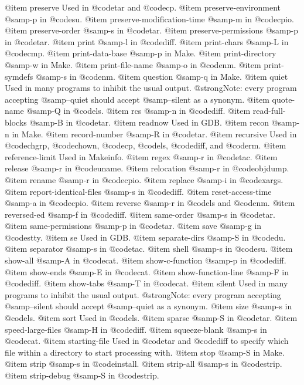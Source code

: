 @item preserve
Used in @code{tar} and @code{cp}.
@item preserve-environment
@samp{-p} in @code{su}.
@item preserve-modification-time
@samp{-m} in @code{cpio}.
@item preserve-order
@samp{-s} in @code{tar}.
@item preserve-permissions
@samp{-p} in @code{tar}.
@item print
@samp{-l} in @code{diff}.
@item print-chars
@samp{-L} in @code{cmp}.
@item print-data-base
@samp{-p} in Make.
@item print-directory
@samp{-w} in Make.
@item print-file-name
@samp{-o} in @code{nm}.
@item print-symdefs
@samp{-s} in @code{nm}.
@item question
@samp{-q} in Make.
@item quiet
Used in many programs to inhibit the usual output.  @strong{Note:} every
program accepting @samp{--quiet} should accept @samp{--silent} as a
synonym.
@item quote-name
@samp{-Q} in @code{ls}.
@item rcs
@samp{-n} in @code{diff}.
@item read-full-blocks
@samp{-B} in @code{tar}.
@item readnow
Used in GDB.
@item recon
@samp{-n} in Make.
@item record-number
@samp{-R} in @code{tar}.
@item recursive
Used in @code{chgrp}, @code{chown}, @code{cp}, @code{ls}, @code{diff},
and @code{rm}.
@item reference-limit
Used in Makeinfo.
@item regex
@samp{-r} in @code{tac}.
@item release
@samp{-r} in @code{uname}.
@item relocation
@samp{-r} in @code{objdump}.
@item rename
@samp{-r} in @code{cpio}.
@item replace
@samp{-i} in @code{xargs}.
@item report-identical-files
@samp{-s} in @code{diff}.
@item reset-access-time
@samp{-a} in @code{cpio}.
@item reverse
@samp{-r} in @code{ls} and @code{nm}.
@item reversed-ed
@samp{-f} in @code{diff}.
@item same-order
@samp{-s} in @code{tar}.
@item same-permissions
@samp{-p} in @code{tar}.
@item save
@samp{-g} in @code{stty}.
@item se
Used in GDB.
@item separate-dirs
@samp{-S} in @code{du}.
@item separator
@samp{-s} in @code{tac}.
@item shell
@samp{-s} in @code{su}.
@item show-all
@samp{-A} in @code{cat}.
@item show-c-function
@samp{-p} in @code{diff}.
@item show-ends
@samp{-E} in @code{cat}.
@item show-function-line
@samp{-F} in @code{diff}.
@item show-tabs
@samp{-T} in @code{cat}.
@item silent
Used in many programs to inhibit the usual output.
@strong{Note:} every program accepting
@samp{--silent} should accept @samp{--quiet} as a synonym.
@item size
@samp{-s} in @code{ls}.
@item sort
Used in @code{ls}.
@item sparse
@samp{-S} in @code{tar}.
@item speed-large-files
@samp{-H} in @code{diff}.
@item squeeze-blank
@samp{-s} in @code{cat}.
@item starting-file
Used in @code{tar} and @code{diff} to specify which file within
a directory to start processing with.
@item stop
@samp{-S} in Make.
@item strip
@samp{-s} in @code{install}.
@item strip-all
@samp{-s} in @code{strip}.
@item strip-debug
@samp{-S} in @code{strip}.
